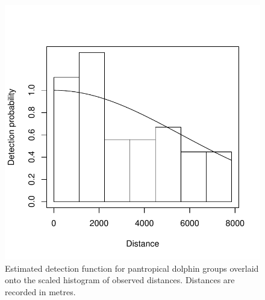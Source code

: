 \documentclass[a4paper,12pt]{article}
\begin{document}
\newpage

\begin{figure}[h!]
  \caption{Estimated detection function for pantropical dolphin groups overlaid onto the scaled histogram of observed distances. Distances are recorded in metres.}
  \label{dolphin-df}
  \begin{center}
    \includegraphics[width=\textwidth]{distances}
  \end{center}
\end{figure}

\newpage
\end{document}
